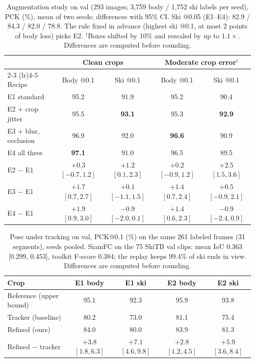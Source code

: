 \documentclass{article}
\begin{document}
\begin{table}[h]
  \centering
  \small
  \setlength{\tabcolsep}{4pt}
  \begin{tabular}{lcccc}
    \toprule
    & \multicolumn{2}{c}{Clean crops} & \multicolumn{2}{c}{Moderate crop error$^{\dagger}$} \\
    \cmidrule(lr){2-3} \cmidrule(lr){4-5}
    Recipe & Body @0.1 & Ski @0.1 & Body @0.1 & Ski @0.1 \\
    \midrule
    E1 standard & 95.2 & 91.9 & 95.2 & 90.4 \\
    E2 + crop jitter & 95.5 & \textbf{93.1} & 95.3 & \textbf{92.9} \\
    E3 + blur, occlusion & 96.9 & 92.0 & \textbf{96.6} & 90.9 \\
    E4 all three & \textbf{97.1} & 91.0 & 96.5 & 89.5 \\
    \midrule
    E2 $-$ E1 & $+0.3$ $[-0.7, 1.2]$ & $+1.2$ $[0.1, 2.3]$ & $+0.2$ $[-0.9, 1.2]$ & $+2.5$ $[1.5, 3.6]$ \\
    E3 $-$ E1 & $+1.7$ $[0.7, 2.7]$ & $+0.1$ $[-1.1, 1.5]$ & $+1.4$ $[0.7, 2.4]$ & $+0.5$ $[-0.9, 2.1]$ \\
    E4 $-$ E1 & $+1.9$ $[0.9, 3.0]$ & $-0.9$ $[-2.0, 0.1]$ & $+1.4$ $[0.6, 2.3]$ & $-0.9$ $[-2.4, 0.9]$ \\
    \bottomrule
  \end{tabular}
  \caption{Augmentation study on val (293 images; 3,759 body / 1,752 ski labels per seed), PCK (\%), mean of two
  seeds; differences with 95\% CI. Ski @0.05 (E1--E4): 82.9 / 84.3 / 82.0 / 78.8. The rule fixed in advance (highest ski @0.1, at most 2 points of body loss)
  picks E2. $^{\dagger}$Boxes shifted by 10\% and rescaled by up to $1.1\times$. Differences are computed before
  rounding.}
  \label{tab:aug_val}
\end{table}

\begin{table}[h]
  \centering
  \small
  \begin{tabular}{lcccc}
    \toprule
    Crop & E1 body & E1 ski & E2 body & E2 ski \\
    \midrule
    Reference (upper bound) & 95.1 & 92.3 & 95.9 & 93.8 \\
    Tracker (baseline) & 80.2 & 73.0 & 81.1 & 75.4 \\
    Refined (ours) & 84.0 & 80.0 & 83.9 & 81.3 \\
    \midrule
    Refined $-$ tracker & $+3.8$ $[1.8, 6.3]$ & $+7.1$ $[4.6, 9.8]$ & $+2.8$ $[1.2, 4.5]$ & $+5.9$ $[3.6, 8.4]$ \\
    \bottomrule
  \end{tabular}
  \caption{Pose under tracking on val, PCK@0.1 (\%) on the same 261 labeled frames (31 segments), seeds pooled.
  SiamFC on the 75 SkiTB val clips: mean IoU 0.363 [0.299, 0.453], toolkit F-score 0.384; the replay keeps
  99.4\% of ski ends in view. Differences are computed before rounding.}
  \label{tab:system_val}
\end{table}
\end{document}
